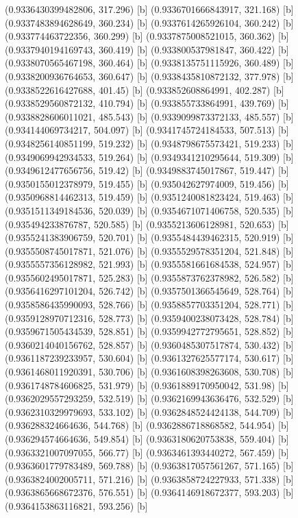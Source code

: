 {{{(0.9336430399482806, 317.296) [b] 
(0.9336701666843917, 321.168) [b] 
(0.9337483894628649, 360.234) [b] 
(0.9337614265926104, 360.242) [b] 
(0.933774463722356, 360.299) [b] 
(0.9337875008521015, 360.362) [b] 
(0.9337940194169743, 360.419) [b] 
(0.933800537981847, 360.422) [b] 
(0.9338070565467198, 360.464) [b] 
(0.9338135751115926, 360.489) [b] 
(0.9338200936764653, 360.647) [b] 
(0.9338435810872132, 377.978) [b] 
(0.9338522616427688, 401.45) [b] 
(0.933852608864991, 402.287) [b] 
(0.9338529560872132, 410.794) [b] 
(0.933855733864991, 439.769) [b] 
(0.9338828606011021, 485.543) [b] 
(0.9339099873372133, 485.557) [b] 
(0.934144069734217, 504.097) [b] 
(0.9341745724184533, 507.513) [b] 
(0.9348256140851199, 519.232) [b] 
(0.9348798675573421, 519.233) [b] 
(0.9349069942934533, 519.264) [b] 
(0.9349341210295644, 519.309) [b] 
(0.9349612477656756, 519.42) [b] 
(0.9349883745017867, 519.447) [b] 
(0.9350155012378979, 519.455) [b] 
(0.935042627974009, 519.456) [b] 
(0.9350968814462313, 519.459) [b] 
(0.9351240081823424, 519.463) [b] 
(0.9351511349184536, 520.039) [b] 
(0.9354671071406758, 520.535) [b] 
(0.935494233876787, 520.585) [b] 
(0.9355213606128981, 520.653) [b] 
(0.9355241383906759, 520.701) [b] 
(0.9355484439462315, 520.919) [b] 
(0.9355508745017871, 521.076) [b] 
(0.9355529578351204, 521.848) [b] 
(0.9355557356128982, 521.993) [b] 
(0.9355581661684538, 524.957) [b] 
(0.9355602495017871, 525.283) [b] 
(0.9355873762378982, 526.582) [b] 
(0.9356416297101204, 526.742) [b] 
(0.9357501366545649, 528.764) [b] 
(0.9358586435990093, 528.766) [b] 
(0.9358857703351204, 528.771) [b] 
(0.9359128970712316, 528.773) [b] 
(0.9359400238073428, 528.784) [b] 
(0.9359671505434539, 528.851) [b] 
(0.9359942772795651, 528.852) [b] 
(0.9360214040156762, 528.857) [b] 
(0.9360485307517874, 530.432) [b] 
(0.9361187239233957, 530.604) [b] 
(0.9361327625577174, 530.617) [b] 
(0.9361468011920391, 530.706) [b] 
(0.9361608398263608, 530.708) [b] 
(0.9361748784606825, 531.979) [b] 
(0.9361889170950042, 531.98) [b] 
(0.9362029557293259, 532.519) [b] 
(0.9362169943636476, 532.529) [b] 
(0.9362310329979693, 533.102) [b] 
(0.9362848524424138, 544.709) [b] 
(0.936288324664636, 544.768) [b] 
(0.9362886718868582, 544.954) [b] 
(0.936294574664636, 549.854) [b] 
(0.9363180620753838, 559.404) [b] 
(0.9363321007097055, 566.77) [b] 
(0.9363461393440272, 567.459) [b] 
(0.9363601779783489, 569.788) [b] 
(0.9363817057561267, 571.165) [b] 
(0.9363824002005711, 571.216) [b] 
(0.9363858724227933, 571.338) [b] 
(0.9363865668672376, 576.551) [b] 
(0.9364146918672377, 593.203) [b] 
(0.9364153863116821, 593.256) [b] 
}}}
